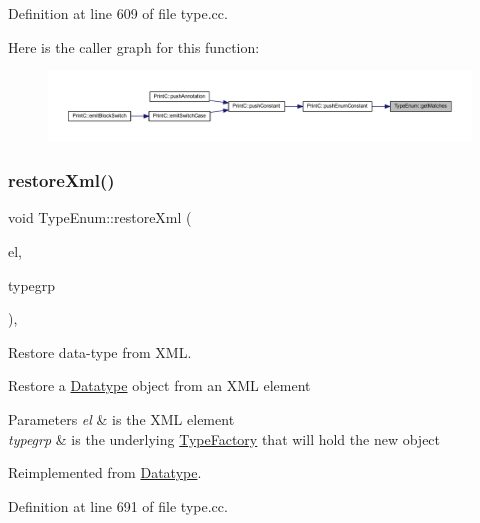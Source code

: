 Definition at line 609 of file type.\+cc.

Here is the caller graph for this function\+:
\nopagebreak
\begin{figure}[H]
\begin{center}
\leavevmode
\includegraphics[width=350pt]{class_type_enum_a9ea9c9d8c439990a5be5828ec2d9b9fd_icgraph}
\end{center}
\end{figure}
\mbox{\label{class_type_enum_a1bd4dc88f4ea0b58b4b164b4b5f4f5e5}} 
\subsubsection{\texorpdfstring{restoreXml()}{restoreXml()}}
{\footnotesize\ttfamily void Type\+Enum\+::restore\+Xml (\begin{DoxyParamCaption}\item[{const \mbox{\hyperlink{class_element}{Element}} $\ast$}]{el,  }\item[{\mbox{\hyperlink{class_type_factory}{Type\+Factory}} \&}]{typegrp }\end{DoxyParamCaption})\hspace{0.3cm}{\ttfamily [protected]}, {\ttfamily [virtual]}}



Restore data-\/type from X\+ML. 

Restore a \mbox{\hyperlink{class_datatype}{Datatype}} object from an X\+ML element 
\begin{DoxyParams}{Parameters}
{\em el} & is the X\+ML element \\
\hline
{\em typegrp} & is the underlying \mbox{\hyperlink{class_type_factory}{Type\+Factory}} that will hold the new object \\
\hline
\end{DoxyParams}


Reimplemented from \mbox{\hyperlink{class_datatype_aed882ae693a31a64d56fffb9abdaa575}{Datatype}}.



Definition at line 691 of file type.\+cc.

